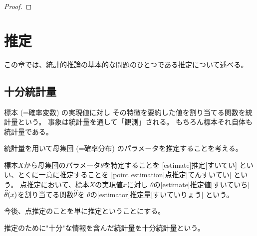 \documentclass[report]{jlreq}
\begin{document}
\begin{proof}
    \TODO{}
\end{proof}



%
\chapter{推定}

この章では、統計的推論の基本的な問題のひとつである推定について述べる。

%
\section{十分統計量}

標本 (=確率変数) の実現値に対し
その特徴を要約した値を割り当てる関数を統計量という。
事象は統計量を通して「観測」される。
もちろん標本それ自体も統計量である。

\begin{definition}[統計量]
    \TODO{}
\end{definition}

統計量を用いて母集団 (=確率分布) のパラメータを推定することを考える。

\begin{definition}[点推定]
    標本$X$から母集団のパラメータ$\theta$を特定することを
    [estimate]{推定}[すいてい]
    といい、とくに一意に推定することを
    [point estimation]{点推定}[てんすいてい]
    という。
    点推定において、標本$X$の実現値$x$に対し
    $\theta$の[estimate]{推定値}[すいていち]
    $\widehat{\theta}(x)$を割り当てる関数$\widehat{\theta}$を
    $\theta$の[estimator]{推定量}[すいていりょう]
    という。
\end{definition}

\begin{remark}
    今後、点推定のことを単に推定ということにする。
\end{remark}

推定のために"十分"な情報を含んだ統計量を十分統計量という。

\begin{definition}[十分統計量]
    \TODO{}
\end{definition}
\end{document}
